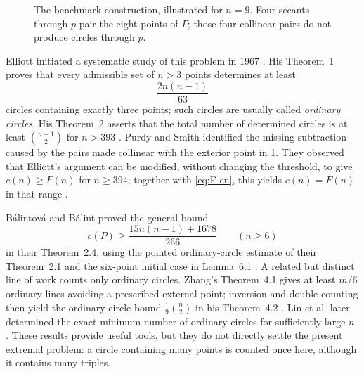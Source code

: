 \documentclass[11pt,a4paper]{article}
\theoremstyle{definition}
\begin{document}
\begin{figure}[ht]
\centering
{}
\caption{The benchmark construction, illustrated for $n=9$.  Four secants through
$p$ pair the eight points of $\Gamma$; those four collinear pairs do not produce
circles through $p$.}
\label{fig:benchmark-en}
\end{figure}

Elliott initiated a systematic study of this problem in 1967
\cite{elliott-en}.  His Theorem~1 proves
that every admissible set of $n>3$ points determines at least
\[
\frac{2n(n-1)}{63}
\]
circles containing exactly three points; such circles are usually called
\emph{ordinary circles}.  His Theorem~2 asserts that the total number of determined
circles is at least $\binom{n-1}{2}$ for $n>393$
\cite[Theorems~1--2]{elliott-en}.  Purdy and Smith identified the missing
subtraction caused by the pairs made collinear with the exterior point in
\cref{fig:benchmark-en}.  They observed that Elliott's argument can be modified,
without changing the threshold, to give $c(n)\ge F(n)$ for $n\ge394$; together
with \eqref{eq:F-en}, this yields $c(n)=F(n)$ in that range
\cite[\S2.1]{purdy-smith-en}.

B\'alintov\'a and B\'alint proved the general bound
\[
c(P)\ge \frac{15n(n-1)+1678}{266}\qquad(n\ge6)
\]
in their Theorem~2.4, using the pointed ordinary-circle estimate of their
Theorem~2.1 and the six-point initial case in Lemma~6.1
\cite[Theorems~2.1 and 2.4 and Lemma~6.1]{balintova-en}.  A related but distinct
line of work counts only ordinary circles.  Zhang's Theorem~4.1 gives at least
$m/6$ ordinary lines avoiding a prescribed external point; inversion and double
counting then yield the ordinary-circle bound $\frac19\binom n2$ in his
Theorem~4.2 \cite[Theorems~4.1--4.2]{zhang-en}.  Lin et al. later determined the
exact minimum number of ordinary circles for sufficiently large $n$
\cite[Theorem~1.1(i)]{lin-et-al-en}.  These results provide useful tools, but they
do not directly settle the present extremal problem: a circle containing many
points is counted once here, although it contains many triples.
\end{document}
